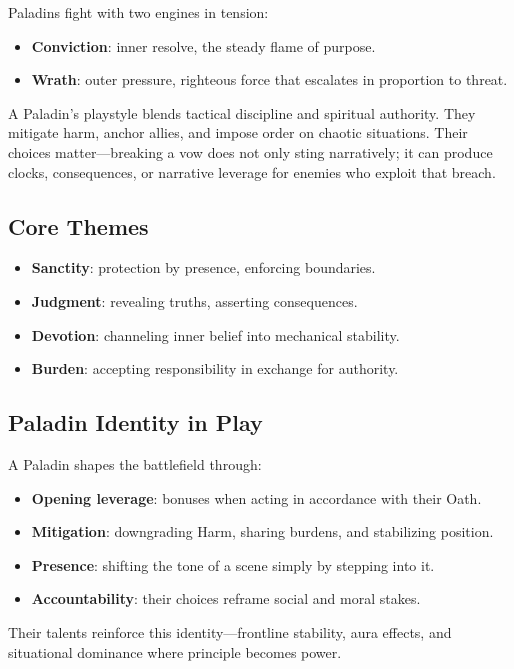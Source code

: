 \documentclass[11pt]{book}
\begin{document}
Paladins fight with two engines in tension:
\begin{itemize}
  \item \textbf{Conviction}: inner resolve, the steady flame of purpose.
  \item \textbf{Wrath}: outer pressure, righteous force that escalates in proportion to threat.
\end{itemize}

A Paladin's playstyle blends tactical discipline and spiritual authority. They mitigate harm,
anchor allies, and impose order on chaotic situations. Their choices matter---breaking a vow
does not only sting narratively; it can produce clocks, consequences, or narrative leverage
for enemies who exploit that breach.

\subsection{Core Themes}
\begin{itemize}
  \item \textbf{Sanctity}: protection by presence, enforcing boundaries.
  \item \textbf{Judgment}: revealing truths, asserting consequences.
  \item \textbf{Devotion}: channeling inner belief into mechanical stability.
  \item \textbf{Burden}: accepting responsibility in exchange for authority.
\end{itemize}

\subsection{Paladin Identity in Play}
A Paladin shapes the battlefield through:
\begin{itemize}
  \item \textbf{Opening leverage}: bonuses when acting in accordance with their Oath.
  \item \textbf{Mitigation}: downgrading Harm, sharing burdens, and stabilizing position.
  \item \textbf{Presence}: shifting the tone of a scene simply by stepping into it.
  \item \textbf{Accountability}: their choices reframe social and moral stakes.
\end{itemize}

\noindent Their talents reinforce this identity---frontline stability, aura effects,
and situational dominance where principle becomes power.
\end{document}
